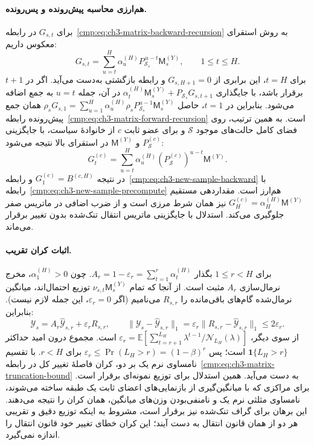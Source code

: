 \paragraph{هم‌ارزی محاسبه پیش‌رونده و پس‌رونده.}
برای $G_{s,t}$ در
رابطه~\eqref{cmp:eq:ch3-matrix-backward-recursion}
به روش استقرای معکوس داریم:
\begin{equation}\label{eq:app-ch3-backward-recursion-proof}
G_{s,t}
=\sum_{u=t}^{H}\alpha_u^{(H)}
P_{\mathcal S_s}^{\,u-t}\mathsf M_s^{(Y)},
\qquad 1\le t\le H.
\end{equation}
برای $t=H$، این برابری از $G_{s,H+1}=0$
و رابطه بازگشتی به‌دست می‌آید.
اگر در $t+1$ برقرار باشد، با جایگذاری
$\alpha_t^{(H)}\mathsf M_s^{(Y)}
+P_{\mathcal S_s}G_{s,t+1}$
در آن، جمله $u=t$ به جمع اضافه می‌شود.
بنابراین در $t=1$، حاصل
$\rho_sG_{s,1}
=\sum_{u=1}^{H}\alpha_u^{(H)}
\rho_sP_{\mathcal S_s}^{u-1}\mathsf M_s^{(Y)}$
همان جمع پیش‌رونده
رابطه~\eqref{cmp:eq:ch3-matrix-forward-recursion} است.
به همین ترتیب، روی فضای کامل حالت‌های موجود
$\mathcal S$ و برای عضو ثابت $c$ از خانوادهٔ سیاست،
با جایگزینی $P_{\mathcal S}^{(c)}$ و $\mathsf M^{(Y)}$
در استقرای بالا نتیجه می‌شود:
\[
G_t^{(c)}=\sum_{u=t}^{H}\alpha_u^{(H)}
(P_{\mathcal S}^{(c)})^{u-t}\mathsf M^{(Y)}.
\]
در نتیجه $G_1^{(c)}=B^{(c,H)}$ و
رابطه~\eqref{cmp:eq:ch3-new-sample-backward}
با رابطه~\eqref{cmp:eq:ch3-new-sample-precompute}
هم‌ارز است. مقداردهی مستقیم
$G_H^{(c)}=\alpha_H^{(H)}\mathsf M^{(Y)}$
نیز همان شرط مرزی است و از ضرب اضافی در ماتریس صفر
جلوگیری می‌کند. استدلال با جایگزینی ماتریس انتقال
تنک‌شده بدون تغییر برقرار می‌ماند.

\paragraph{اثبات کران تقریب.}
برای $1\le r<H$ بگذار
$A_r=1-\varepsilon_r=\sum_{t=1}^r\alpha_t^{(H)}$.
چون $\alpha_1^{(H)}>0$، مخرج نرمال‌سازی
$A_r$ مثبت است.
از آنجا که تمام $\nu_{s,t}\mathsf M_s^{(Y)}$ توزیع احتمال‌اند، میانگین نرمال‌شده گام‌های باقی‌مانده را $R_{s,r}$ می‌نامیم (اگر $\varepsilon_r=0$، این جمله لازم نیست). بنابراین:
\begin{equation}\label{eq:app-ch3-truncation-mixture}
\mathscr Y_s=A_r\widehat{\mathscr Y}_{s,r}
+\varepsilon_rR_{s,r},\qquad
\|\mathscr Y_s-\widehat{\mathscr Y}_{s,r}\|_1
=\varepsilon_r\|R_{s,r}-\widehat{\mathscr Y}_{s,r}\|_1
\le2\varepsilon_r.
\end{equation}
از سوی دیگر،
$\varepsilon_r=\mathbb E[
\sum_{t=r+1}^{L_H}\lambda^{t-1}/\mathcal N_{L_H}(\lambda)]$
است. مجموع درون امید حداکثر
$\mathbf1\{L_H>r\}$ است؛ پس
$\varepsilon_r\le\Pr(L_H>r)=(1-\beta)^r$ برای $r<H$.
با تقسیم نامساوی نرم یک بر دو، کران فاصلهٔ
تغییر کل در رابطه~\eqref{cmp:eq:ch3-matrix-truncation-bound}
به دست می‌آید. همین استدلال برای توزیع نمونه‌ای
برقرار است. برای مراکزی که با میانگین‌گیری از
بازنمایی‌های اعضای ثابت یک طبقه ساخته می‌شوند،
نامساوی مثلثی نرم یک و نامنفی‌بودن وزن‌های میانگین،
همان کران را نتیجه می‌دهند. این برهان برای گراف
تنک‌شده نیز برقرار است، مشروط به اینکه توزیع دقیق
و تقریبی هر دو از همان قانون انتقال به دست آیند؛
این کران خطای تغییر خود قانون انتقال را اندازه نمی‌گیرد.

